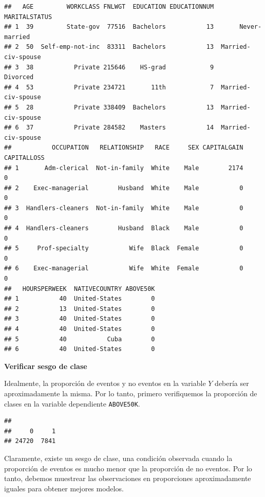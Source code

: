 \documentclass[]{book}
\newenvironment{Shaded}{\begin{snugshade}}{\end{snugshade}}
\newcommand{\KeywordTok}[1]{\textcolor[rgb]{0.13,0.29,0.53}{\textbf{#1}}}
\newcommand{\OperatorTok}[1]{\textcolor[rgb]{0.81,0.36,0.00}{\textbf{#1}}}
\newcommand{\NormalTok}[1]{#1}
\begin{document}
\begin{verbatim}
##   AGE         WORKCLASS FNLWGT  EDUCATION EDUCATIONNUM       MARITALSTATUS
## 1  39         State-gov  77516  Bachelors           13       Never-married
## 2  50  Self-emp-not-inc  83311  Bachelors           13  Married-civ-spouse
## 3  38           Private 215646    HS-grad            9            Divorced
## 4  53           Private 234721       11th            7  Married-civ-spouse
## 5  28           Private 338409  Bachelors           13  Married-civ-spouse
## 6  37           Private 284582    Masters           14  Married-civ-spouse
##           OCCUPATION   RELATIONSHIP   RACE     SEX CAPITALGAIN CAPITALLOSS
## 1       Adm-clerical  Not-in-family  White    Male        2174           0
## 2    Exec-managerial        Husband  White    Male           0           0
## 3  Handlers-cleaners  Not-in-family  White    Male           0           0
## 4  Handlers-cleaners        Husband  Black    Male           0           0
## 5     Prof-specialty           Wife  Black  Female           0           0
## 6    Exec-managerial           Wife  White  Female           0           0
##   HOURSPERWEEK  NATIVECOUNTRY ABOVE50K
## 1           40  United-States        0
## 2           13  United-States        0
## 3           40  United-States        0
## 4           40  United-States        0
## 5           40           Cuba        0
## 6           40  United-States        0
\end{verbatim}

\textbf{Verificar sesgo de clase}

Idealmente, la proporción de eventos y no eventos en la variable \(Y\)
debería ser aproximadamente la misma. Por lo tanto, primero verifiquemos
la proporción de clases en la variable dependiente \texttt{ABOVE50K}.

\begin{Shaded}
\end{Shaded}

\begin{verbatim}
## 
##     0     1 
## 24720  7841
\end{verbatim}

Claramente, existe un sesgo de clase, una condición observada cuando la
proporción de eventos es mucho menor que la proporción de no eventos.
Por lo tanto, debemos muestrear las observaciones en proporciones
aproximadamente iguales para obtener mejores modelos.
\end{document}
